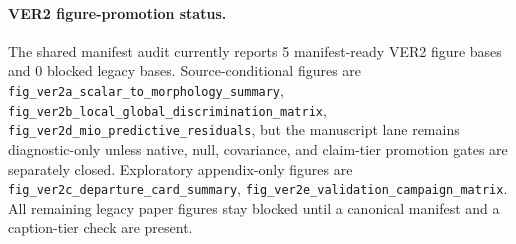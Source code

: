 \paragraph{VER2 figure-promotion status.}
The shared manifest audit currently reports 5 manifest-ready VER2 figure
bases and 0 blocked legacy bases. Source-conditional figures are
\texttt{fig\_ver2a\_scalar\_to\_morphology\_summary}, \texttt{fig\_ver2b\_local\_global\_discrimination\_matrix}, \texttt{fig\_ver2d\_mio\_predictive\_residuals}, but the manuscript lane remains diagnostic-only unless
native, null, covariance, and claim-tier promotion gates are separately closed.
Exploratory appendix-only figures are \texttt{fig\_ver2c\_departure\_card\_summary}, \texttt{fig\_ver2e\_validation\_campaign\_matrix}. All remaining legacy
paper figures stay blocked until a canonical manifest and a caption-tier check
are present.
